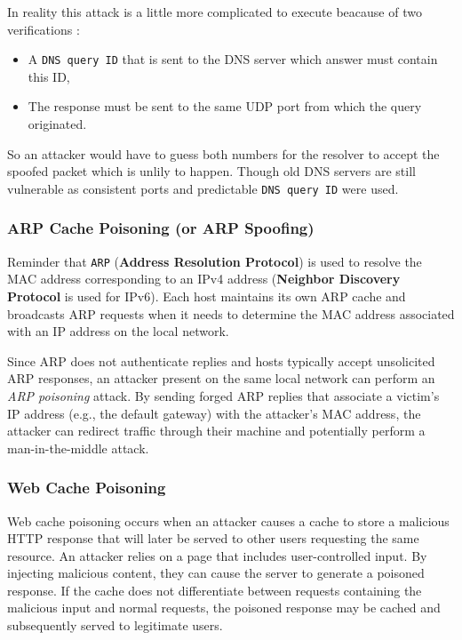 In reality this attack is a little more complicated to execute beacause of two verifications : 
\begin{itemize}
    \item A \texttt{DNS query ID} that is sent to the DNS server which answer must contain this ID,
    \item The response must be sent to the same UDP port from which the query originated.
\end{itemize}

So an attacker would have to guess both numbers for the resolver to accept the spoofed packet which is unlily to happen. Though old DNS servers are still vulnerable as consistent ports and predictable \texttt{DNS query ID} were used.

\subsubsection{ARP Cache Poisoning (or ARP Spoofing)}
Reminder that \texttt{ARP} (\textbf{Address Resolution Protocol}) is used to resolve the MAC address corresponding to an IPv4 address (\textbf{Neighbor Discovery Protocol} is used for IPv6). Each host maintains its own ARP cache and broadcasts ARP requests when it needs to determine the MAC address associated with an IP address on the local network.

Since ARP does not authenticate replies and hosts typically accept unsolicited ARP responses, an attacker present on the same local network can perform an \textit{ARP poisoning} attack. By sending forged ARP replies that associate a victim's IP address (e.g., the default gateway) with the attacker's MAC address, the attacker can redirect traffic through their machine and potentially perform a man-in-the-middle attack.

\subsubsection{Web Cache Poisoning}
Web cache poisoning occurs when an attacker causes a cache to store a malicious HTTP response that will later be served to other users requesting the same resource. An attacker relies on a page that includes user-controlled input. By injecting malicious content, they can cause the server to generate a poisoned response. If the cache does not differentiate between requests containing the malicious input and normal requests, the poisoned response may be cached and subsequently served to legitimate users.


